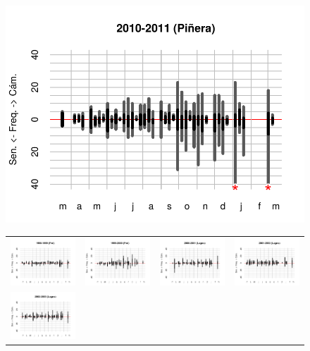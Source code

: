 \documentclass[letter,12pt]{article}
\begin{document}
\begin{figure}
\begin{center}
 \includegraphics[width=.65\columnwidth]{../graphs/urgenciasHistog2010.pdf}
\begin{tabular}{cccc}
    \includegraphics[width=.22\columnwidth]{../graphs/urgenciasHistog1998.pdf} &
    \includegraphics[width=.22\columnwidth]{../graphs/urgenciasHistog1999.pdf} &
    \includegraphics[width=.22\columnwidth]{../graphs/urgenciasHistog2000.pdf} &
    \includegraphics[width=.22\columnwidth]{../graphs/urgenciasHistog2001.pdf} \\
    \includegraphics[width=.22\columnwidth]{../graphs/urgenciasHistog2002.pdf} &

\end{tabular}
\end{center}
\end{figure}
\end{document}
